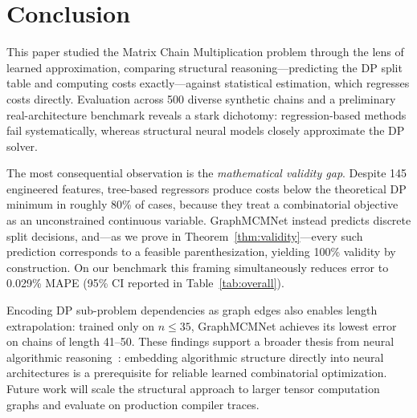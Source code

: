 \documentclass[conference]{IEEEtran}
\begin{document}

\section{Conclusion}
This paper studied the Matrix Chain Multiplication problem through the lens of
learned approximation, comparing structural reasoning---predicting the DP split
table and computing costs exactly---against statistical estimation, which regresses
costs directly. Evaluation across 500 diverse synthetic chains and a preliminary
real-architecture benchmark reveals a stark
dichotomy: regression-based methods fail systematically, whereas structural neural
models closely approximate the DP solver.

The most consequential observation is the \emph{mathematical validity gap}.
Despite 145 engineered features, tree-based regressors produce costs below the
theoretical DP minimum in roughly 80\% of cases, because they treat a
combinatorial objective as an unconstrained continuous variable. GraphMCMNet
instead predicts discrete split decisions, and---as we prove in
Theorem~\ref{thm:validity}---every such prediction corresponds to a feasible
parenthesization, yielding 100\% validity by construction. On our benchmark this
framing simultaneously reduces error to 0.029\% MAPE (95\% CI reported in
Table~\ref{tab:overall}).

Encoding DP sub-problem dependencies as graph edges also enables length
extrapolation: trained only on $n{\le}35$, GraphMCMNet achieves its lowest error
on chains of length 41--50. These findings support a broader thesis from neural
algorithmic reasoning~\cite{b25,b26,b27,b28}: embedding algorithmic structure
directly into neural architectures is a prerequisite for reliable learned
combinatorial optimization. Future work will scale the structural approach
to larger tensor computation graphs and evaluate on production compiler traces.
\end{document}
